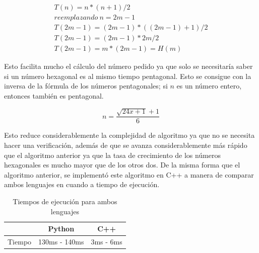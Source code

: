\documentclass[12pt, twoclumn]{article}
\begin{document}
\begin{equation}
   \begin{gathered}
      T(n) = n * (n + 1) / 2\\
      reemplazando ~n = 2m - 1\\
      T(2m - 1) = (2m - 1) * ((2m - 1) + 1) / 2\\
      T(2m - 1) = (2m - 1) * 2m / 2\\
      T(2m - 1) = m * (2m - 1) = H(m)
   \end{gathered}
\end{equation}

Esto facilita mucho el cálculo del número pedido ya que solo se necesitaría saber si un número hexagonal es al mismo tiempo pentagonal. Esto se consigue con la inversa de la fórmula de los números pentagonales; si $ n $ es un número entero, entonces también es pentagonal.

\begin{equation}
   n = \frac{\sqrt{24x + 1} + 1}{6}
\end{equation}

Esto reduce considerablemente la complejidad de algoritmo ya que no se necesita hacer una verificación, además de que se avanza considerablemente más rápido que el algoritmo anterior
ya que la tasa de crecimiento de los números hexagonales es mucho mayor que de los otros dos. De la misma forma que el algoritmo anterior, se implementó este algoritmo en C++ a
manera de comparar ambos lenguajes en cuando a tiempo de ejecución.

\begin{table}[H]
   \centering
   \caption{Tiempos de ejecución para ambos lenguajes}
   \begin{tabular}{ccc}
      & Python & C++\\
      \hline
      Tiempo & 130ms - 140ms & 3ms - 6ms\\
   \end{tabular}
\end{table}
\end{document}
